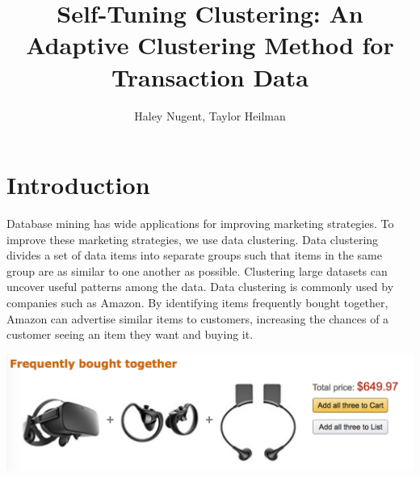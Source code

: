 \documentclass[11pt,reqno]{amsart}
\theoremstyle{definition}
\numberwithin{equation}{subsection}
\begin{document}
\title{Self-Tuning Clustering: An Adaptive Clustering Method for Transaction Data}

\author{Haley Nugent, Taylor Heilman}


\maketitle

\section{Introduction}

Database mining has wide applications for improving marketing strategies. To improve these marketing strategies, we use data clustering. Data clustering divides a set of data items into separate groups such that items in the same group are as similar to one another as possible. Clustering large datasets can uncover useful patterns among the data.  Data clustering is commonly used by companies such as Amazon.  By identifying items frequently bought together, Amazon can advertise similar items to customers, increasing the chances of a customer seeing an item they want and buying it.

\includegraphics[scale=.5]{amazon}
\end{document}
